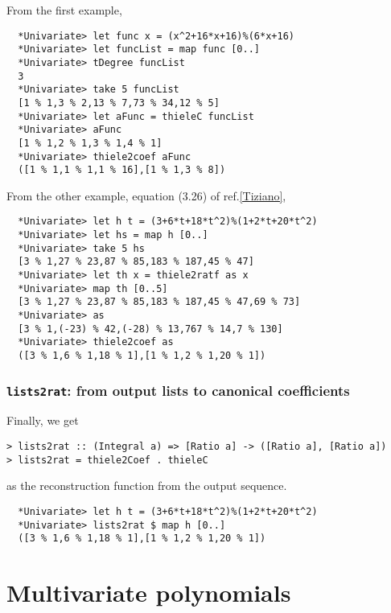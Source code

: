 \documentclass[11pt]{book}
\begin{document}
From the first example,
\begin{verbatim}
  *Univariate> let func x = (x^2+16*x+16)%(6*x+16)
  *Univariate> let funcList = map func [0..]
  *Univariate> tDegree funcList 
  3
  *Univariate> take 5 funcList 
  [1 % 1,3 % 2,13 % 7,73 % 34,12 % 5]
  *Univariate> let aFunc = thieleC funcList 
  *Univariate> aFunc
  [1 % 1,2 % 1,3 % 1,4 % 1]
  *Univariate> thiele2coef aFunc
  ([1 % 1,1 % 1,1 % 16],[1 % 1,3 % 8])
\end{verbatim}

From the other example, equation (3.26) of ref.\ref{Tiziano},
\begin{verbatim}
  *Univariate> let h t = (3+6*t+18*t^2)%(1+2*t+20*t^2)
  *Univariate> let hs = map h [0..]
  *Univariate> take 5 hs
  [3 % 1,27 % 23,87 % 85,183 % 187,45 % 47]
  *Univariate> let th x = thiele2ratf as x
  *Univariate> map th [0..5]
  [3 % 1,27 % 23,87 % 85,183 % 187,45 % 47,69 % 73]
  *Univariate> as
  [3 % 1,(-23) % 42,(-28) % 13,767 % 14,7 % 130]
  *Univariate> thiele2coef as
  ([3 % 1,6 % 1,18 % 1],[1 % 1,2 % 1,20 % 1])
\end{verbatim}

\subsubsection{\texttt{lists2rat}: from output lists to canonical coefficients}
Finally, we get
\begin{verbatim}
> lists2rat :: (Integral a) => [Ratio a] -> ([Ratio a], [Ratio a])
> lists2rat = thiele2Coef . thieleC
\end{verbatim}
as the reconstruction function from the output sequence.
\begin{verbatim}
  *Univariate> let h t = (3+6*t+18*t^2)%(1+2*t+20*t^2)
  *Univariate> lists2rat $ map h [0..]
  ([3 % 1,6 % 1,18 % 1],[1 % 1,2 % 1,20 % 1])
\end{verbatim}





\section{Multivariate polynomials}
\end{document}
